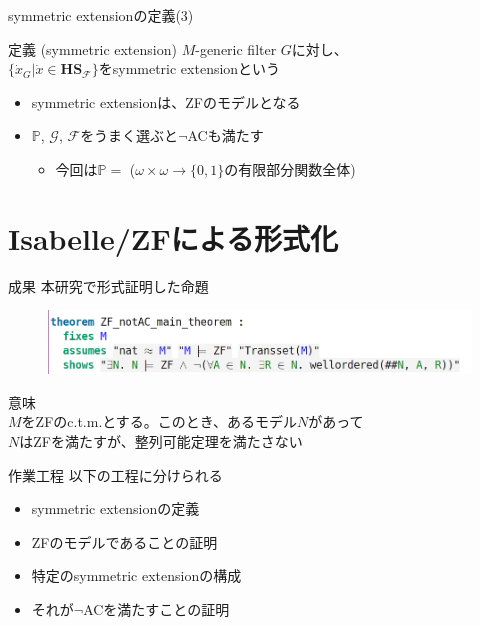 \documentclass[17pt,aspectratio=169]{beamer}
\newcommand{\Pbb}{\mathbb{P}}
\newcommand{\Gcal}{\mathcal{G}}
\newcommand{\Fcal}{\mathcal{F}}
\begin{document}
\begin{frame}{symmetric extensionの定義(3)}
    \begin{itembox}[l]{定義 (symmetric extension)}
        {\small
            $M$-generic filter $G$に対し、\\$\{ \dot{x}_G | \dot{x} \in \bm{\mathbf{HS}}_{\Fcal} \}$をsymmetric extensionという
        }
    \end{itembox}

    \begin{itemize}
        \item symmetric extensionは、ZFのモデルとなる
        \item $\Pbb$, $\Gcal$, $\Fcal$をうまく選ぶと$\neg$ACも満たす
        {\small \begin{itemize}
            \item 今回は$\Pbb =$ ($\omega \times \omega \rightarrow \{0,1\}$の有限部分関数全体)
        \end{itemize} }
    \end{itemize}
\end{frame}

\section {Isabelle/ZFによる形式化}

\begin{frame}{成果}
    本研究で形式証明した命題
    \vspace{-1cm}
    \hspace{-1.5cm}
    \begin{figure}
        \includegraphics[width=1.1\linewidth]{./images/ZF_notAC_main_theorem.png}
    \end{figure}

    \vspace{-5pt}
    意味 \\
    {\small
    \hspace{1cm} $M$をZFのc.t.m.とする。このとき、あるモデル$N$があって\\
    \hspace{1cm} $N$はZFを満たすが、整列可能定理を満たさない
    }
\end{frame}

\begin{frame}{作業工程}
    以下の工程に分けられる
    {\small
    \begin{itemize}[itemsep=8pt]
        \item symmetric extensionの定義
        \item ZFのモデルであることの証明
        \item 特定のsymmetric extensionの構成
        \item それが$\neg$ACを満たすことの証明
    \end{itemize} }
\end{frame}
\end{document}
